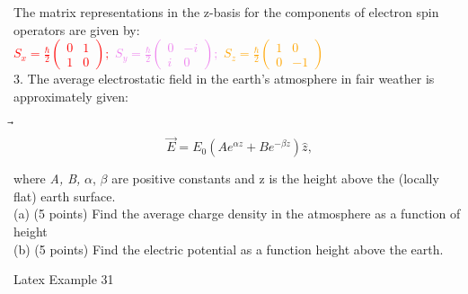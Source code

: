 \documentclass[12pt]{article}
\begin{document}
\begin{enumerate}
The matrix representations in the z-basis for the components of electron spin operators are
given by:\\

\textcolor{red}{$S_x=\frac{\hbar}{2}\begin{pmatrix}
          0 & 1\\       
          1 & 0
          \end{pmatrix};$} \hspace{10mm}
\textcolor{violet}{$S_y=\frac{\hbar}{2}\begin{pmatrix}
          0 & -i\\       
          i & 0
          \end{pmatrix};$} \hspace{10mm}
\textcolor{orange}{$S_z=\frac{\hbar}{2}\begin{pmatrix}
          1 & 0\\
          0 & -1
          \end{pmatrix}$}\\
          
3. The average electrostatic field in the earth’s atmosphere in fair weather is approximately given:

⃗\begin{equation}
            \vec{E} = E_0(Ae^{\alpha z} + Be^{-\beta z}) \hat{z},    
\end{equation}
              



where \textit{A, B,} $\alpha$, $\beta$ are positive constants and z is the height above the (locally flat) earth surface. \\


(a) (5 points) Find the average charge density in the atmosphere as a function of height \\


(b) (5 points) Find the electric potential as a function height above the earth.

\end{enumerate}

Latex Example \hspace{135mm}31
\clearpage %



\end{document}
